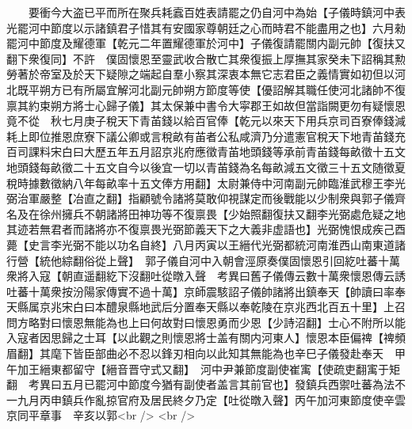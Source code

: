 　　要衝今大盗已平而所在聚兵耗蠧百姓表請罷之仍自河中為始【子儀時鎮河中表光罷河中節度以示諸鎮君子惜其有安國家尊朝廷之心而時君不能盡用之也】六月勑罷河中節度及耀德軍【乾元二年置耀德軍於河中】子儀復請罷關内副元帥【復扶又翻下衆復同】不許　僕固懷恩至靈武收合散亡其衆復振上厚撫其家癸未下詔稱其勲勞著於帝室及於天下疑隙之端起自羣小察其深衷本無它志君臣之義情實如初但以河北既平朔方已有所屬宜解河北副元帥朔方節度等使【優詔解其職任使河北諸帥不復禀其約束朔方將士心歸子儀】其太保兼中書令大寜郡王如故但當詣闕更勿有疑懷恩竟不從　秋七月庚子稅天下青苖錢以給百官俸【乾元以來天下用兵京司百寮俸錢減耗上即位推恩庶寮下議公卿或言稅畝有苖者公私咸濟乃分遣憲官稅天下地青苖錢充百司課料宋白曰大歷五年五月詔京兆府應徵青苖地頭錢等承前青苖錢每畝徵十五文地頭錢每畝徵二十五文自今以後宜一切以青苖錢為名每畝減五文徵三十五文随徵夏稅時據數徵納八年每畝率十五文俸方用翻】太尉兼侍中河南副元帥臨淮武穆王李光弼治軍嚴整【冶直之翻】指顧號令諸將莫敢仰視謀定而後戰能以少制衆與郭子儀齊名及在徐州擁兵不朝諸將田神功等不復禀畏【少始照翻復扶又翻李光弼處危疑之地其迹若無君者而諸將亦不復禀畏光弼節義天下之大義非虚語也】光弼愧恨成疾己酉薨【史言李光弼不能以功名自終】八月丙寅以王縉代光弼都統河南淮西山南東道諸行營【統他綜翻俗從上聲】　郭子儀自河中入朝會涇原奏僕固懷恩引回紇吐蕃十萬衆將入寇【朝直遥翻紇下沒翻吐從暾入聲　考異曰舊子儀傳云數十萬衆懷恩傳云誘吐蕃十萬衆按汾陽家傳實不過十萬】京師震駭詔子儀帥諸將出鎮奉天【帥讀曰率奉天縣属京兆宋白曰本醴泉縣地武后分置奉天縣以奉乾陵在京兆西北百五十里】上召問方略對曰懷恩無能為也上曰何故對曰懷恩勇而少恩【少詩沼翻】士心不附所以能入寇者因思歸之士耳【以此觀之則懷恩將士盖有關内河東人】懷恩本臣偏禆【禆頻眉翻】其麾下皆臣部曲必不忍以鋒刃相向以此知其無能為也辛巳子儀發赴奉天　甲午加王縉東都留守【縉音晋守式又翻】　河中尹兼節度副使崔㝢【使疏吏翻㝢于矩翻　考異曰五月已罷河中節度今猶有副使者盖言其前官也】發鎮兵西禦吐蕃為法不一九月丙申鎮兵作亂掠官府及居民終夕乃定【吐從暾入聲】丙午加河東節度使辛雲京同平章事　辛亥以郭<br />
<br />
